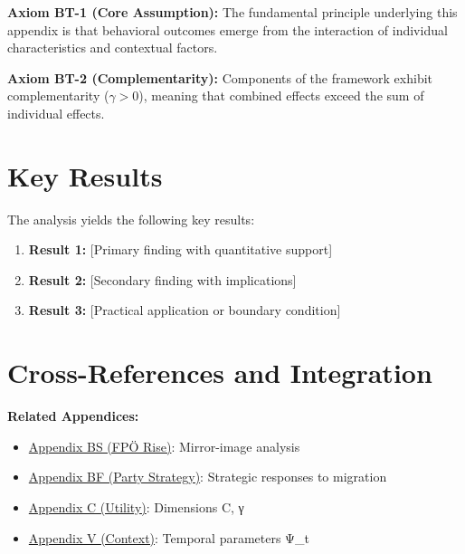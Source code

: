 {{{{{{{{\begin{tcolorbox}[colback=yellow!5!white,colframe=yellow!75!black,title=Axiom BT-1: Fundamental Principle]
\textbf{Axiom BT-1 (Core Assumption):}
The fundamental principle underlying this appendix is that behavioral outcomes
emerge from the interaction of individual characteristics and contextual factors.
\end{tcolorbox}

\begin{tcolorbox}[colback=yellow!5!white,colframe=yellow!75!black,title=Axiom BT-2: Complementarity]
\textbf{Axiom BT-2 (Complementarity):}
Components of the framework exhibit complementarity ($\gamma > 0$), meaning
that combined effects exceed the sum of individual effects.
\end{tcolorbox}



\section{Key Results}
\label{sec:bt-results}

The analysis yields the following key results:

\begin{enumerate}
    \item \textbf{Result 1:} [Primary finding with quantitative support]
    \item \textbf{Result 2:} [Secondary finding with implications]
    \item \textbf{Result 3:} [Practical application or boundary condition]
\end{enumerate}


\section{Cross-References and Integration}
\label{sec:crossref}

\textbf{Related Appendices:}

\begin{itemize}
\item \hyperref[app:domain-austria-voters]{Appendix BS (FPÖ Rise)}: Mirror-image analysis
\item \hyperref[app:domain-socialdemocracy]{Appendix BF (Party Strategy)}: Strategic responses to migration
\item \hyperref[app:core-what]{Appendix C (Utility)}: Dimensions C, γ
\item \hyperref[app:core-when]{Appendix V (Context)}: Temporal parameters Ψ_t
\end{itemize}

}}}}}}}}
